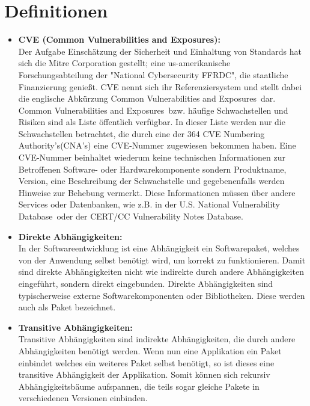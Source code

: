\section{Definitionen} \label{sec:Definitionen}
\begin{itemize}
    \item \textbf{CVE (Common Vulnerabilities and Exposures):} \\
    Der Aufgabe Einschätzung der Sicherheit und Einhaltung von Standards hat sich die Mitre Corporation gestellt; eine us-amerikanische Forschungsabteilung der "National Cybersecurity FFRDC", die staatliche Finanzierung genießt.
    CVE nennt sich ihr Referenziersystem und stellt dabei die englische Abkürzung \glqq Common Vulnerabilities and Exposures\grqq~dar.
    \\
    \glqq Common Vulnerabilities and Exposures\grqq~bzw. häufige Schwachstellen und Risiken sind als Liste öffentlich verfügbar.
    In dieser Liste werden nur die Schwachstellen betrachtet, die durch eine der 364 \glqq CVE Numbering Authority's\grqq (CNA's) eine CVE-Nummer zugewiesen bekommen haben.\cite{}
    Eine CVE-Nummer beinhaltet wiederum keine technischen Informationen zur Betroffenen Software- oder Hardwarekomponente sondern Produktname, Version, eine Beschreibung der Schwachstelle und gegebenenfalls werden Hinweise zur Behebung vermerkt.
    Diese Informationen müssen über andere Services oder Datenbanken, wie z.B. in der \glqq U.S. National Vulnerability Database\grqq~oder der \glqq CERT/CC Vulnerability Notes Database\grqq.

    \item \textbf{Direkte Abhängigkeiten:} \\
    In der Softwareentwicklung ist eine Abhängigkeit ein Softwarepaket, welches von der Anwendung selbst benötigt wird, um korrekt zu funktionieren.
    Damit sind direkte Abhängigkeiten nicht wie indirekte durch andere Abhängigkeiten eingeführt, sondern direkt eingebunden.
    Direkte Abhängigkeiten sind typischerweise externe Softwarekomponenten oder Bibliotheken.
    Diese werden auch als Paket bezeichnet. 

    \item \textbf{Transitive Abhängigkeiten:} \\
    Transitive Abhängigkeiten sind indirekte Abhängigkeiten, die durch andere Abhängigkeiten benötigt werden.
    Wenn nun eine Applikation ein Paket einbindet welches ein weiteres Paket selbst benötigt, so ist dieses eine transitive Abhängigkeit der Applikation.
    Somit können sich rekursiv Abhängigkeitsbäume aufspannen, die teils sogar gleiche Pakete in verschiedenen Versionen einbinden.
    

\end{itemize}
